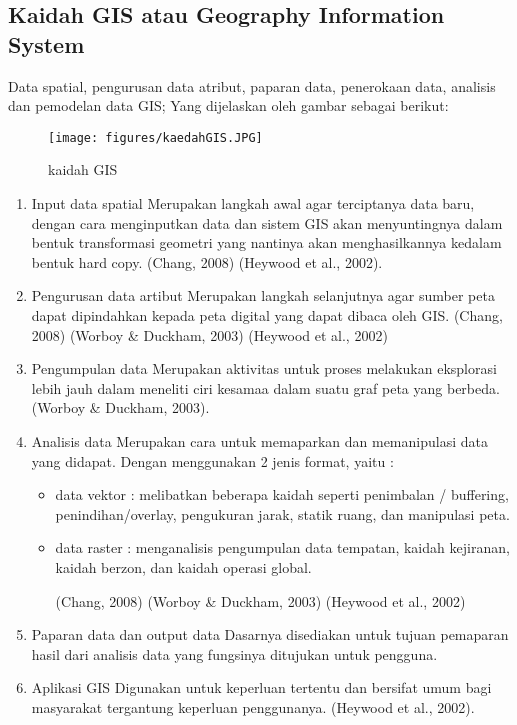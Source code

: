 \subsection{Kaidah GIS atau Geography Information System}
Data spatial, pengurusan data atribut, paparan data, penerokaan data, analisis dan pemodelan data GIS;
Yang dijelaskan oleh gambar sebagai berikut:

\begin{figure}[ht]
	\centerline{\texttt{[image: figures/kaedahGIS.JPG]}}
	\caption{kaidah GIS}
	\label{kaidah GIS}
	\end{figure}


\begin{enumerate}
\item Input data spatial
Merupakan langkah awal agar terciptanya data baru, dengan cara menginputkan data dan sistem GIS akan menyuntingnya dalam bentuk transformasi geometri yang nantinya akan menghasilkannya kedalam bentuk hard copy. (Chang, 2008) 
(Heywood et al., 2002).

\item Pengurusan data artibut
Merupakan langkah selanjutnya agar sumber peta dapat dipindahkan kepada peta digital yang dapat dibaca oleh GIS.
(Chang, 2008) (Worboy \& Duckham, 2003) (Heywood et al., 2002)

\item Pengumpulan data
Merupakan aktivitas untuk proses melakukan eksplorasi lebih jauh dalam meneliti ciri kesamaa dalam suatu graf peta yang berbeda. (Worboy \& Duckham, 2003).

\item Analisis data
Merupakan cara untuk memaparkan dan memanipulasi data yang didapat. Dengan menggunakan 2 jenis format, yaitu :
\begin{itemize}
\item data vektor : melibatkan beberapa kaidah seperti penimbalan / buffering, penindihan/overlay, pengukuran jarak, statik ruang, dan manipulasi peta.
\item data raster : menganalisis pengumpulan data tempatan, kaidah kejiranan, kaidah berzon, dan kaidah operasi global.

(Chang, 2008) (Worboy \& Duckham, 2003) (Heywood et al., 2002)
\end{itemize}

\item Paparan data dan output data
Dasarnya disediakan untuk tujuan pemaparan hasil dari analisis data yang fungsinya ditujukan untuk pengguna.

\item Aplikasi GIS
Digunakan untuk keperluan tertentu dan bersifat umum bagi masyarakat tergantung keperluan penggunanya. 
(Heywood et al., 2002).
\end{enumerate}


